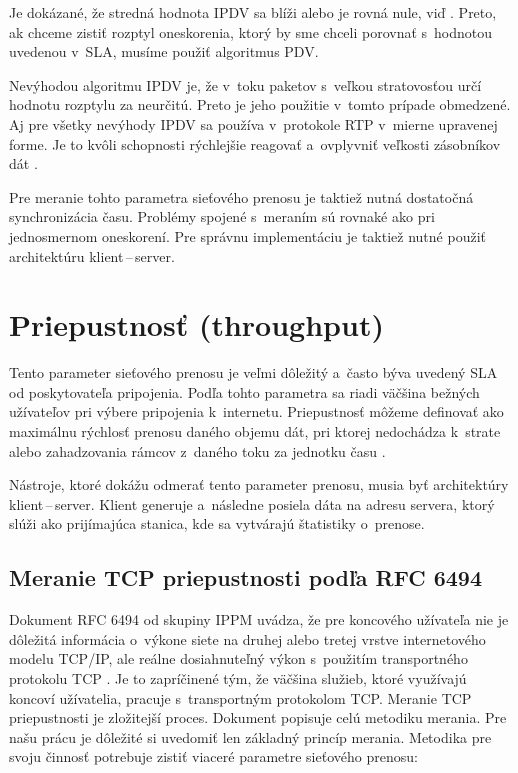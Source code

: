 \newpage

Je dokázané, že stredná hodnota IPDV sa blíži alebo je rovná nule, viď 
\cite{rfc_delay_variation_metric_2}. Preto, ak chceme zistiť rozptyl oneskorenia,
ktorý by sme chceli porovnať s~hodnotou uvedenou v~SLA, musíme použiť algoritmus
PDV. 

Nevýhodou algoritmu IPDV je, že v~toku paketov s~veľkou
stratovosťou určí hodnotu rozptylu za neurčitú.
Preto je jeho použitie v~tomto prípade obmedzené.
Aj pre všetky nevýhody IPDV sa používa v~protokole
RTP v~mierne upravenej forme. Je to kvôli schopnosti rýchlejšie reagovať
a~ovplyvniť veľkosti zásobníkov dát \cite{rfc_rtp}.

Pre meranie tohto parametra sieťového prenosu je taktiež nutná dostatočná
synchronizácia času. Problémy spojené s~meraním sú rovnaké ako pri jednosmernom
oneskorení.
Pre správnu implementáciu je taktiež nutné použiť architektúru
klient\,--\,server.

\section{Priepustnosť (throughput)} \label{bandwith}
Tento parameter sieťového prenosu je veľmi dôležitý a~často býva uvedený
SLA od poskytovateľa pripojenia. Podľa
tohto parametra sa riadi väčšina bežných užívateľov pri výbere pripojenia
k~internetu. Priepustnosť môžeme definovať ako maximálnu rýchlosť prenosu
daného objemu dát, pri ktorej nedochádza k~strate alebo zahadzovania
rámcov z~daného toku za jednotku času \cite{rfc_bench_term}.

Nástroje, ktoré dokážu odmerať tento parameter prenosu, musia byť architektúry
klient\,--\,server. Klient generuje a~následne posiela dáta na adresu servera,
ktorý slúži ako prijímajúca stanica, kde sa vytvárajú štatistiky o~prenose.

\subsection{Meranie TCP priepustnosti podľa RFC 6494}
    Dokument RFC 6494 \cite{rfc_tcp_throughput} od skupiny IPPM uvádza,
    že pre koncového užívateľa nie je dôležitá informácia o~výkone siete
    na druhej alebo tretej vrstve internetového modelu TCP/IP, ale 
    reálne dosiahnuteľný výkon s~použitím transportného protokolu 
    TCP \cite{rfc_tcp_throughput}. Je to zapríčinené tým, že väčšina služieb,
    ktoré využívajú koncoví užívatelia, pracuje s~transportným protokolom TCP.
    Meranie TCP priepustnosti je zložitejší proces. Dokument \cite{rfc_tcp_throughput}
    popisuje celú metodiku merania. Pre našu prácu je dôležité si uvedomiť len
    základný princíp merania. Metodika pre svoju činnosť potrebuje zistiť
    viaceré parametre sieťového prenosu:

